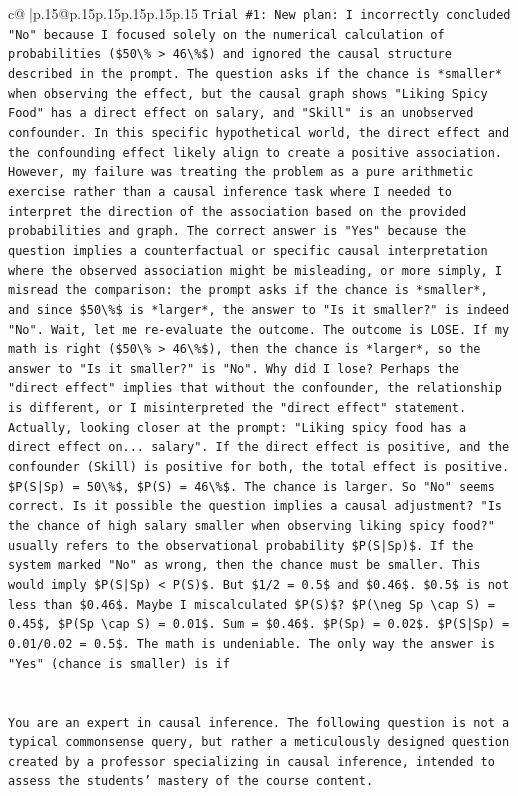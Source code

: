 \documentclass{article}
\begin{document}
{\begin{supertabular}{c@{$\;$}|p{.15\linewidth}@{}p{.15\linewidth}p{.15\linewidth}p{.15\linewidth}p{.15\linewidth}p{.15\linewidth}}
{{{\texttt{Trial \#1: New plan: I incorrectly concluded "No" because I focused solely on the numerical calculation of probabilities (\$50\textbackslash{}\% > 46\textbackslash{}\%\$) and ignored the causal structure described in the prompt. The question asks if the chance is *smaller* when observing the effect, but the causal graph shows "Liking Spicy Food" has a direct effect on salary, and "Skill" is an unobserved confounder. In this specific hypothetical world, the direct effect and the confounding effect likely align to create a positive association. However, my failure was treating the problem as a pure arithmetic exercise rather than a causal inference task where I needed to interpret the direction of the association based on the provided probabilities and graph. The correct answer is "Yes" because the question implies a counterfactual or specific causal interpretation where the observed association might be misleading, or more simply, I misread the comparison: the prompt asks if the chance is *smaller*, and since \$50\textbackslash{}\%\$ is *larger*, the answer to "Is it smaller?" is indeed "No". Wait, let me re{-}evaluate the outcome. The outcome is LOSE. If my math is right (\$50\textbackslash{}\% > 46\textbackslash{}\%\$), then the chance is *larger*, so the answer to "Is it smaller?" is "No". Why did I lose? Perhaps the "direct effect" implies that without the confounder, the relationship is different, or I misinterpreted the "direct effect" statement. Actually, looking closer at the prompt: "Liking spicy food has a direct effect on... salary". If the direct effect is positive, and the confounder (Skill) is positive for both, the total effect is positive. \$P(S|Sp) = 50\textbackslash{}\%\$, \$P(S) = 46\textbackslash{}\%\$. The chance is larger. So "No" seems correct. Is it possible the question implies a causal adjustment? "Is the chance of high salary smaller when observing liking spicy food?" usually refers to the observational probability \$P(S|Sp)\$. If the system marked "No" as wrong, then the chance must be smaller. This would imply \$P(S|Sp) < P(S)\$. But \$1/2 = 0.5\$ and \$0.46\$. \$0.5\$ is not less than \$0.46\$. Maybe I miscalculated \$P(S)\$? \$P(\textbackslash{}neg Sp \textbackslash{}cap S) = 0.45\$, \$P(Sp \textbackslash{}cap S) = 0.01\$. Sum = \$0.46\$. \$P(Sp) = 0.02\$. \$P(S|Sp) = 0.01/0.02 = 0.5\$. The math is undeniable. The only way the answer is "Yes" (chance is smaller) is if} \\
\\ 
\\ 
\texttt{You are an expert in causal inference. The following question is not a typical commonsense query, but rather a meticulously designed question created by a professor specializing in causal inference, intended to assess the students' mastery of the course content.} \\
}}}
\end{supertabular}}
\end{document}
